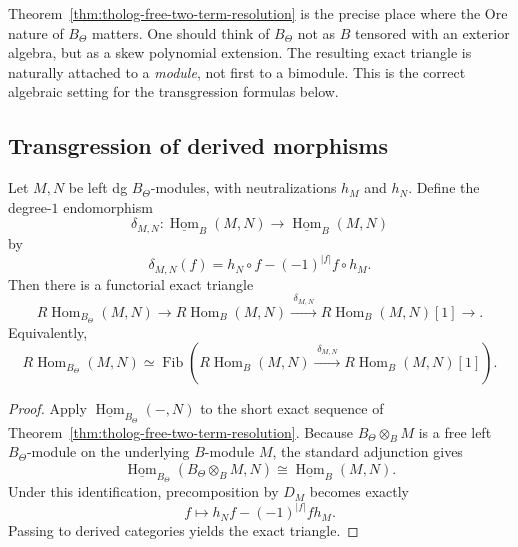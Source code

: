 \begin{remark}
Theorem~\ref{thm:tholog-free-two-term-resolution} is the precise place where the Ore nature of \(B_{\Theta}\) matters.
One should think of \(B_{\Theta}\) not as \(B\) tensored with an exterior algebra, but as a skew polynomial extension.
The resulting exact triangle is naturally attached to a \emph{module}, not first to a bimodule.
This is the correct algebraic setting for the transgression formulas below.
\end{remark}

\subsection{Transgression of derived morphisms}

\begin{theorem}
Let \(M,N\) be left dg \(B_{\Theta}\)-modules, with neutralizations \(h_{M}\) and \(h_{N}\).
Define the degree-\(1\) endomorphism
\[
\delta_{M,N}:\underline{\operatorname{Hom}}_{B}(M,N)\longrightarrow
\underline{\operatorname{Hom}}_{B}(M,N)
\]
by
\[
\delta_{M,N}(f)=h_{N}\circ f-(-1)^{|f|}f\circ h_{M}.
\]
Then there is a functorial exact triangle
\[
R\!\operatorname{Hom}_{B_{\Theta}}(M,N)
\longrightarrow
R\!\operatorname{Hom}_{B}(M,N)
\xrightarrow{\;\delta_{M,N}\;}
R\!\operatorname{Hom}_{B}(M,N)[1]
\longrightarrow .
\]
Equivalently,
\[
R\!\operatorname{Hom}_{B_{\Theta}}(M,N)
\simeq
\operatorname{Fib}\!\left(
R\!\operatorname{Hom}_{B}(M,N)
\xrightarrow{\;\delta_{M,N}\;}
R\!\operatorname{Hom}_{B}(M,N)[1]
\right).
\]
\end{theorem}

\begin{proof}
Apply \(\underline{\operatorname{Hom}}_{B_{\Theta}}(-,N)\) to the short exact sequence of Theorem~\ref{thm:tholog-free-two-term-resolution}.
Because \(B_{\Theta}\otimes_{B}M\) is a free left \(B_{\Theta}\)-module on the underlying \(B\)-module \(M\), the standard adjunction gives
\[
\underline{\operatorname{Hom}}_{B_{\Theta}}(B_{\Theta}\otimes_{B}M,N)
\cong
\underline{\operatorname{Hom}}_{B}(M,N).
\]
Under this identification, precomposition by \(D_{M}\) becomes exactly
\[
f\longmapsto h_{N}f-(-1)^{|f|}fh_{M}.
\]
Passing to derived categories yields the exact triangle.
\end{proof}

